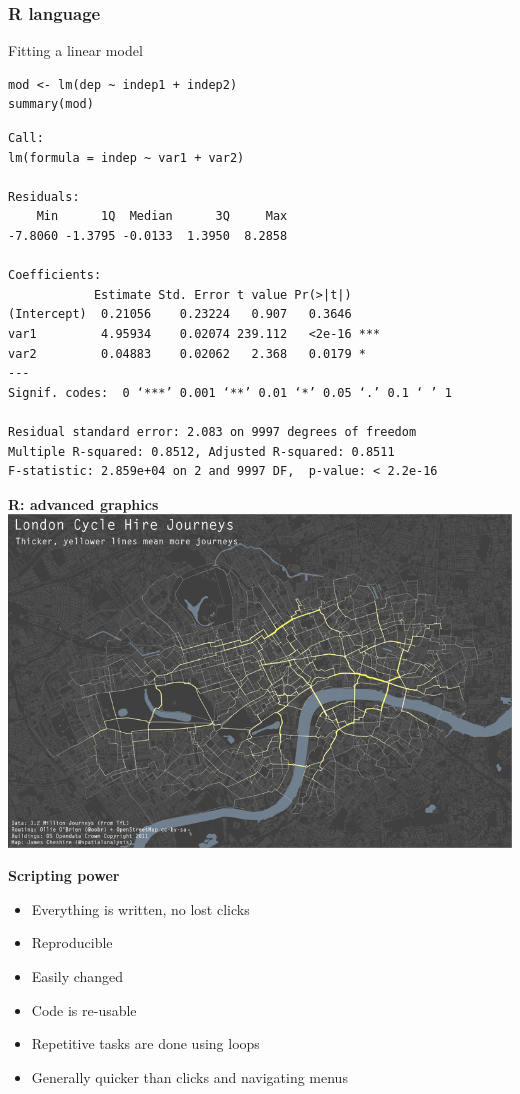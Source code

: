 \documentclass[9pt,xcolor=pdftex,dvipsnames,table]{beamer}
\begin{document}
\begin{frame}[fragile] %
\frametitle{\textbf{R language}}
Fitting a linear model
\begin{verbatim}
mod <- lm(dep ~ indep1 + indep2)
summary(mod)
\end{verbatim}

\scriptsize{
\begin{verbatim}
Call:
lm(formula = indep ~ var1 + var2)

Residuals:
    Min      1Q  Median      3Q     Max 
-7.8060 -1.3795 -0.0133  1.3950  8.2858 

Coefficients:
            Estimate Std. Error t value Pr(>|t|)    
(Intercept)  0.21056    0.23224   0.907   0.3646    
var1         4.95934    0.02074 239.112   <2e-16 ***
var2         0.04883    0.02062   2.368   0.0179 *  
---
Signif. codes:  0 ‘***’ 0.001 ‘**’ 0.01 ‘*’ 0.05 ‘.’ 0.1 ‘ ’ 1 

Residual standard error: 2.083 on 9997 degrees of freedom
Multiple R-squared: 0.8512,	Adjusted R-squared: 0.8511 
F-statistic: 2.859e+04 on 2 and 9997 DF,  p-value: < 2.2e-16
\end{verbatim} 
}
\end{frame}


\begin{frame}{\textbf{R: advanced graphics}}
\centering
\includegraphics[width=1\textwidth]{images/bike-routes.png}
\vspace{-1cm}
\end{frame}

\begin{frame}{\textbf{Scripting power}}
  \begin{itemize}
  \item Everything is written, no lost clicks
  \item Reproducible
  \item Easily changed
  \item Code is re-usable
  \item Repetitive tasks are done using loops
  \item Generally quicker than clicks and navigating menus
  \end{itemize}
\end{frame}
\end{document}
